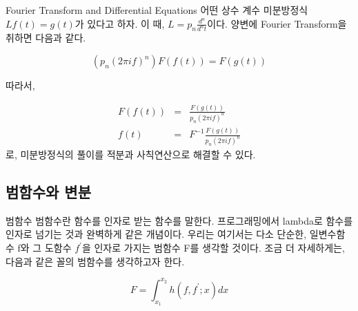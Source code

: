\documentclass{beamer}
\begin{document}
\begin{frame}{Fourier Transform and Differential Equations} 
어떤 상수 계수 미분방정식 $Lf(t) = g(t)$가 있다고 하자. 이 때, $L=p_n\frac{d^n}{d^nt}$이다. 양변에 Fourier Transform을 취하면 다음과 같다. 

\begin{equation} 
(p_n(2\pi i f)^n )F(f(t)) = F(g(t))
\end{equation}

따라서, 

\begin{eqnarray} 
F(f(t)) &=& \frac{F(g(t))}{p_n(2\pi i f)^n}\\
f(t) &=& F^{-1}\frac{F(g(t))}{p_n(2\pi i f)^n}
\end{eqnarray}
로, 미분방정식의 풀이를 적분과 사칙연산으로 해결할 수 있다.
\end{frame}






\subsection{범함수와 변분} 


\begin{frame}{범함수} 
범함수란 함수를 인자로 받는 함수를 말한다. 프로그래밍에서 lambda로 함수를 인자로 넘기는 것과 완벽하게 같은 개념이다. 우리는 여기서는 다소 단순한, 일변수함수 f와 그 도함수 $f^{\prime}$을 인자로 가지는 범함수 F를 생각할 것이다. 조금 더 자세하게는, 다음과 같은 꼴의 범함수를 생각하고자 한다. 

\begin{equation} 
F = \int^{x_2}_{x_1}h(f, f^{\prime}; x) dx 
\end{equation}

\end{frame}
\end{document}
